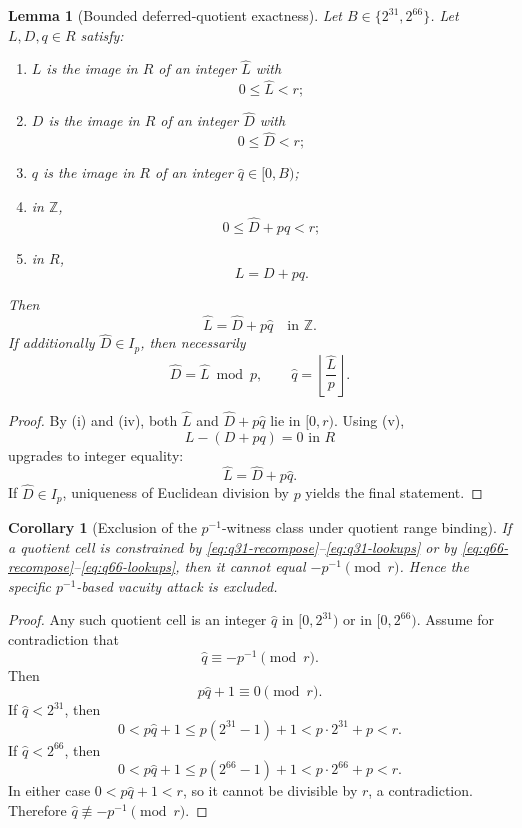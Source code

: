 ﻿\documentclass[11pt]{article}
\newtheorem{lemma}[theorem]{Lemma}
\newtheorem{corollary}[theorem]{Corollary}
\newcommand{\Z}{\mathbb{Z}}
\newcommand{\wt}[1]{\widehat{#1}}
\begin{document}
\begin{lemma}[Bounded deferred-quotient exactness]
\label{lem:bounded-quotient-exactness}
Let \(B\in\{2^{31},2^{66}\}\). Let \(L,D,q\in R\) satisfy:
\begin{enumerate}[label=(\roman*),leftmargin=2em]
    \item \(L\) is the image in \(R\) of an integer \(\wt{L}\) with
    \[
    0 \le \wt{L} < r;
    \]
    \item \(D\) is the image in \(R\) of an integer \(\wt{D}\) with
    \[
    0 \le \wt{D} < r;
    \]
    \item \(q\) is the image in \(R\) of an integer \(\wt{q}\in[0,B)\);
    \item in \(\Z\),
    \[
    0\le \wt{D}+p\wt{q}<r;
    \]
    \item in \(R\),
    \[
    L = D + pq.
    \]
\end{enumerate}
Then
\[
\wt{L}=\wt{D}+p\wt{q}
\quad\text{in }\Z.
\]
If additionally \(\wt{D}\in I_p\), then necessarily
\[
\wt{D} = \wt{L} \bmod p,
\qquad
\wt{q} = \left\lfloor \frac{\wt{L}}{p} \right\rfloor.
\]
\end{lemma}

\begin{proof}
By (i) and (iv), both \(\wt{L}\) and \(\wt{D}+p\wt{q}\) lie in \([0,r)\). Using
(v),
\[
L-(D+pq)=0 \text{ in }R
\]
upgrades to integer equality:
\[
\wt{L}=\wt{D}+p\wt{q}.
\]
If \(\wt{D}\in I_p\), uniqueness of Euclidean division by \(p\) yields the final
statement.
\end{proof}

\begin{corollary}[Exclusion of the \(p^{-1}\)-witness class under quotient range binding]
\label{cor:eliminate-pinv}
If a quotient cell is constrained by \eqref{eq:q31-recompose}--\eqref{eq:q31-lookups} or by \eqref{eq:q66-recompose}--\eqref{eq:q66-lookups}, then it cannot equal \(-p^{-1}\pmod r\). Hence the specific \(p^{-1}\)-based vacuity attack is excluded.
\end{corollary}

\begin{proof}
Any such quotient cell is an integer \(\wt q\) in \([0,2^{31})\) or in
\([0,2^{66})\). Assume for contradiction that
\[
\wt q \equiv -p^{-1}\pmod r.
\]
Then
\[
p\wt q + 1 \equiv 0 \pmod r.
\]
If \(\wt q<2^{31}\), then
\[
0 < p\wt q+1 \le p(2^{31}-1)+1 < p\cdot 2^{31}+p < r.
\]
If \(\wt q<2^{66}\), then
\[
0 < p\wt q+1 \le p(2^{66}-1)+1 < p\cdot 2^{66}+p < r.
\]
In either case \(0<p\wt q+1<r\), so it cannot be divisible by \(r\), a
contradiction. Therefore \(\wt q\not\equiv -p^{-1}\pmod r\).
\end{proof}
\end{document}
